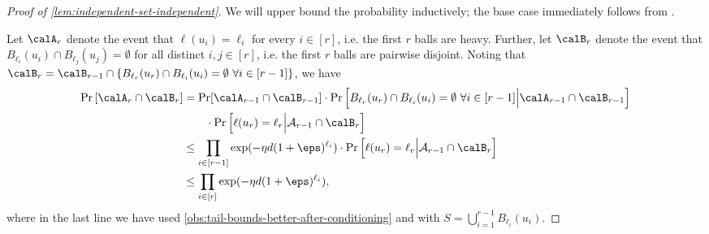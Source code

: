 \documentclass[11pt,letterpaper]{article}
\begin{document}
\begin{proof}[Proof of \cref{lem:independent-set-independent}]
    We will upper bound the probability inductively; the base case immediately follows from .

    Let $\calA_r$ denote the event that $\ell(u_i) = \ell_i$ for every $i \in [r]$, i.e. the first $r$ balls are heavy. 
    Further, let $\calB_r$ denote the event that $B_{\ell_i}(u_i) \cap B_{\ell_j}(u_j) = \emptyset$ for all distinct $i, j \in [r]$, i.e. the first $r$ balls are pairwise disjoint.
    Noting that $\calB_r = \calB_{r-1} \cap \{B_{\ell_r}(u_r) \cap B_{\ell_i}(u_i) = \emptyset \,\, \forall i \in [r-1]\}$, we have
    \begin{align*}
        \Pr\left[ \calA_r \cap \calB_r \right] &= \Pr[\calA_{r-1} \cap \calB_{r-1}] \cdot \Pr\left[B_{\ell_r}(u_r) \cap B_{\ell_i}(u_i) = \emptyset \,\, \forall i \in [r-1] \Big\vert \calA_{r-1} \cap \calB_{r-1}\right] \\
        &\quad\quad \cdot \Pr\left[\ell(u_r) = \ell_r \Big\vert \mathcal{A}_{r-1} \cap \calB_{r}\right] \\
        &\le \prod_{i \in [r-1]} \exp(-\eta d (1+\eps)^{\ell_i}) \cdot \Pr\left[\ell(u_r) = \ell_r \Big\vert \mathcal{A}_{r-1} \cap \calB_{r}\right] \\
        &\le \prod_{i \in [r]} \exp(-\eta d (1+\eps)^{\ell_i}),
    \end{align*}
    where in the last line we have used \cref{obs:tail-bounds-better-after-conditioning} and  with $S = \bigcup_{i =1}^{r-1} B_{\ell_i}(u_i)$.
\end{proof}%
\end{document}
